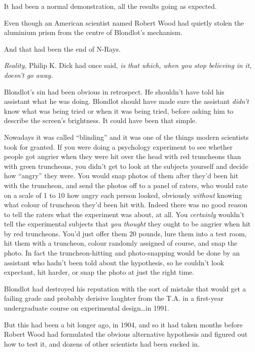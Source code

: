 It had been a normal demonstration, all the results going as expected.

Even though an American scientist named Robert Wood had quietly stolen the aluminium prism from the centre of Blondlot’s mechanism.

And that had been the end of N-Rays.

\emph{Reality,} Philip K. Dick had once said, \emph{is that which, when you stop believing in it, doesn’t go away.}

Blondlot’s sin had been obvious in retrospect. He shouldn’t have told his assistant what he was doing. Blondlot should have made sure the assistant \emph{didn’t} know what was being tried or when it was being tried, before asking him to describe the screen’s brightness. It could have been that simple.

Nowadays it was called “blinding” and it was one of the things modern scientists took for granted. If you were doing a psychology experiment to see whether people got angrier when they were hit over the head with red truncheons than with green truncheons, you didn’t get to look at the subjects yourself and decide how “angry” they were. You would snap photos of them after they’d been hit with the truncheon, and send the photos off to a panel of raters, who would rate on a scale of 1 to 10 how angry each person looked, obviously \emph{without} knowing what colour of truncheon they’d been hit with. Indeed there was no good reason to tell the raters what the experiment was about, at all. You \emph{certainly} wouldn’t tell the experimental subjects that \emph{you thought} they ought to be angrier when hit by red truncheons. You’d just offer them 20 pounds, lure them into a test room, hit them with a truncheon, colour randomly assigned of course, and snap the photo. In fact the truncheon-hitting and photo-snapping would be done by an assistant who hadn’t been told about the hypothesis, so he couldn’t look expectant, hit harder, or snap the photo at just the right time.

Blondlot had destroyed his reputation with the sort of mistake that would get a failing grade and probably derisive laughter from the T.A. in a first-year undergraduate course on experimental design…in 1991.

But this had been a bit longer ago, in 1904, and so it had taken months before Robert Wood had formulated the obvious alternative hypothesis and figured out how to test it, and dozens of other scientists had been sucked in.

